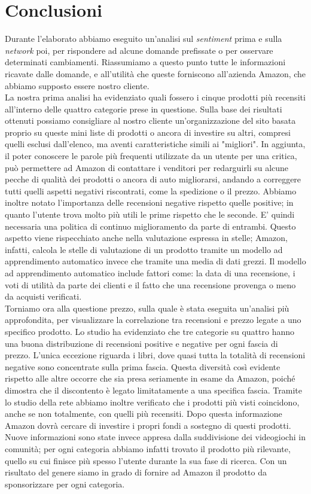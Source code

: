 \chapter{Conclusioni}
	Durante l'elaborato abbiamo eseguito un'analisi sul \textit{sentiment} prima e sulla \textit{network} poi, per rispondere ad alcune domande prefissate o per osservare determinati cambiamenti. Riassumiamo a questo punto tutte le informazioni ricavate dalle domande, e all'utilità che queste forniscono all'azienda Amazon, che abbiamo supposto essere nostro cliente. \\	
	La nostra prima analisi ha evidenziato quali fossero i cinque prodotti più recensiti all'interno delle quattro categorie prese in questione. Sulla base dei risultati ottenuti possiamo consigliare al nostro cliente un'organizzazione del sito basata proprio su queste mini liste di prodotti o ancora di investire su altri, compresi quelli esclusi dall'elenco, ma aventi caratteristiche simili ai "migliori". In aggiunta, il poter conoscere le parole più frequenti utilizzate da un utente per una critica, può permettere ad Amazon di contattare i venditori per redarguirli su alcune pecche di qualità dei prodotti o ancora di auto migliorarsi, andando a correggere tutti quelli aspetti negativi riscontrati, come la spedizione o il prezzo. Abbiamo inoltre notato l'importanza delle recensioni negative rispetto quelle positive; in quanto l'utente trova molto più utili le prime rispetto che le seconde. E' quindi necessaria una politica di continuo miglioramento da parte di entrambi. Questo aspetto viene rispecchiato anche nella valutazione espressa in stelle; Amazon, infatti, calcola le stelle di valutazione di un prodotto tramite un modello ad apprendimento automatico invece che tramite una media di dati grezzi. Il modello ad apprendimento automatico include fattori come: la data di una recensione, i voti di utilità da parte dei clienti e il fatto che una recensione provenga o meno da acquisti verificati.\\
	
	Torniamo ora alla questione prezzo, sulla quale è stata eseguita un'analisi più approfondita, per visualizzare la correlazione tra recensioni e prezzo legate a uno specifico prodotto. Lo studio ha evidenziato che tre categorie su quattro hanno una buona distribuzione di recensioni positive e negative per ogni fascia di prezzo. L'unica eccezione riguarda i libri, dove quasi tutta la totalità di recensioni negative sono concentrate sulla prima fascia. Questa diversità così evidente rispetto alle altre occorre che sia presa seriamente in esame da Amazon, poiché dimostra che il discontento è legato limitatamente a una specifica fascia. Tramite lo studio della rete abbiamo inoltre verificato che i prodotti più visti coincidono, anche se non totalmente, con quelli più recensiti. Dopo questa informazione Amazon dovrà cercare di investire i propri fondi a sostegno di questi prodotti. Nuove informazioni sono state invece appresa dalla suddivisione dei videogiochi in comunità; per ogni categoria abbiamo infatti trovato il prodotto più rilevante, quello su cui finisce più spesso l'utente durante la sua fase di ricerca. Con un risultato del genere siamo in grado di fornire ad Amazon il prodotto da sponsorizzare per ogni categoria.

